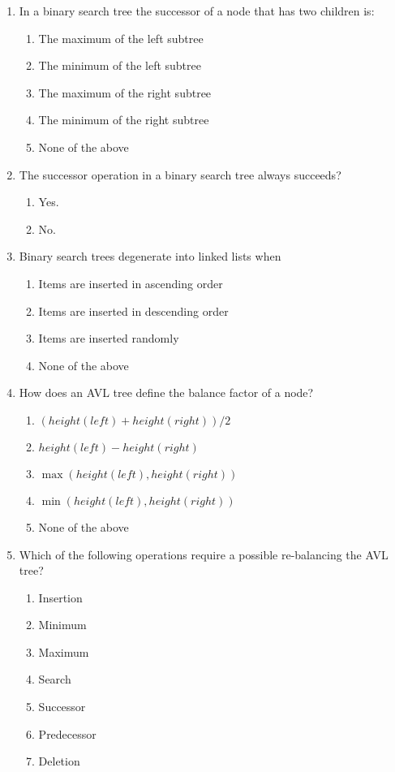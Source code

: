 \documentclass[11pt]{article}
\begin{document}
\begin{enumerate}
\item In a binary search tree the successor of a node that has two
children is:
\begin{enumerate}
\item The maximum of the left subtree
\item The minimum of the left subtree
\item The maximum of the right subtree
\item The minimum of the right subtree
\item None of the above
\end{enumerate}

\item The successor operation in a binary search tree always succeeds?
\begin{enumerate}
\item Yes.
\item No.
\end{enumerate}

\item Binary search trees degenerate into linked lists when
\begin{enumerate}
\item Items are inserted in ascending order
\item Items are inserted in descending order
\item Items are inserted randomly
\item None of the above
\end{enumerate}

\item How does an AVL tree define the balance factor of a node?
\begin{enumerate}
\item \((height(left) + height(right)) / 2\)
\item \(height(left) - height(right)\)
\item \(\max(height(left), height(right))\)
\item \(\min(height(left), height(right))\)
\item None of the above
\end{enumerate}

\item Which of the following operations require a possible re-balancing
the AVL tree?
\begin{enumerate}
\item Insertion
\item Minimum
\item Maximum
\item Search
\item Successor
\item Predecessor
\item Deletion
\end{enumerate}
\end{enumerate}
\end{document}
